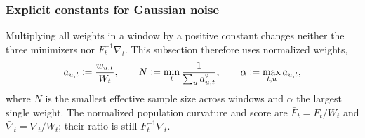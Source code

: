 \documentclass[11pt]{article}
\newcommand{\eqdef}{\mathrel{\vcentcolon=}}
\newcommand{\IF}{F}
\theoremstyle{definition}
\begin{document}
\subsubsection{Explicit constants for Gaussian noise}\label{sec:gaussian}

Multiplying all weights in a window by a positive constant changes neither
the three minimizers nor \(\IF_t^{-1}\nabla_t\).  This subsection therefore
uses normalized weights,
\begin{equation}
  a_{u,t}\eqdef\frac{w_{u,t}}{W_t},\qquad
  N\eqdef\min_t\frac{1}{\sum_u a_{u,t}^2},\qquad
  \alpha\eqdef\max_{t,u}a_{u,t},
  \label{eq:normalized-weights}
\end{equation}
where \(N\) is the smallest effective sample size across windows and
\(\alpha\) the largest single weight.  The normalized population curvature
and score are \(\bar F_t=\IF_t/W_t\) and \(\bar\nabla_t=\nabla_t/W_t\); their
ratio is still \(\IF_t^{-1}\nabla_t\).
\end{document}
